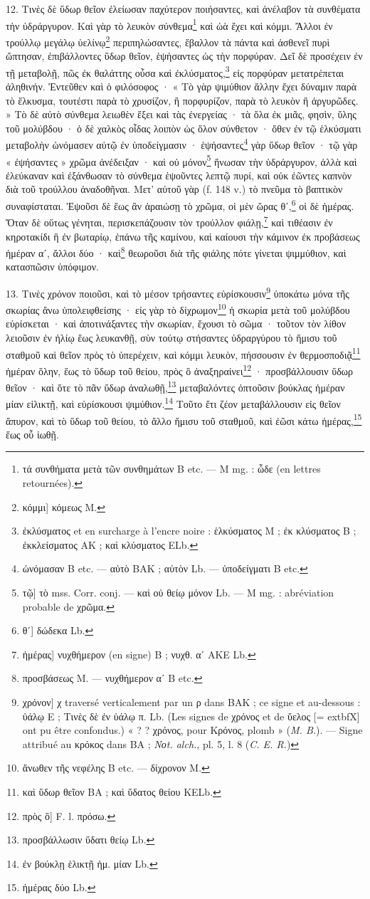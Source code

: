 \documentclass[landscape, a4paper, 11pt, oneside, polutonikogreek, french]{article}
\begin{document}
12. Τινὲς δὲ ὕδωρ θεῖον ἐλείωσαν παχύτερον ποιήσαντες, καὶ ἀνέλαβον τὰ συνθέματα τὴν ὑδράργυρον. Καὶ γὰρ τὸ λευκὸν σύνθεμα\footnote{τά συνθήματα μετὰ τῶν συνθημάτων B etc. --- M mg. : ὧδε (en lettres retournées).} καὶ ὠὰ ἔχει καὶ κόμμι. Ἄλλοι ἐν τρούλλῳ μεγάλῳ ὑελίνῳ\footnote{κόμμι] κόμεως M.} περιπηλώσαντες, ἔβαλλον τὰ πάντα καὶ ἀσθενεῖ πυρὶ ὤπτησαν, ἐπιβάλλοντες ὕδωρ θεῖον, ἑψήσαντες ὡς τὴν πορφύραν. Δεῖ δὲ προσέχειν ἐν τῇ μεταβολῇ, πῶς ἐκ θαλάττης οὖσα καὶ ἐκλύσματος,\footnote{ἐκλύσματος et en surcharge à l'encre noire : ἑλκύσματος M ; ἐκ κλύσματος B ; ἐκκλείσματος AK ; καὶ κλύσματος ELb.} εἰς πορφύραν μετατρέπεται ἀληθινήν. Ἐντεῦθεν καὶ ὁ φιλόσοφος · « Τὸ γὰρ ψιμύθιον ἄλλην ἔχει δύναμιν παρὰ τὸ ἕλκυσμα, τουτέστι παρὰ τὸ χρυσίζον, ἢ πορφυρίζον, παρὰ τὸ λευκὸν ἢ ἀργυρῶδες. » Τὸ δὲ αὐτὸ σύνθεμα λειωθὲν ἕξει καὶ τὰς ἐνεργείας · τὰ ὅλα ἐκ μιᾶς, φησὶν, ὕλης τοῦ μολύβδου · ὁ δὲ χαλκὸς οἶδας λοιπὸν ὡς ὅλον σύνθετον · ὅθεν ἐν τῷ ἑλκύσματι μεταβολὴν ὠνόμασεν αὐτῷ ἐν ὑποδείγμασιν · ἑψήσαντες\footnote{ὠνόμασαν B etc. --- αὐτὸ BAK ; αὐτὸν Lb. --- ὑποδείγματι B etc.} γὰρ ὕδωρ θεῖον · τῷ γὰρ « ἐψήσαντες » χρῶμα ἀνέδειξαν · καὶ οὐ μόνον\footnote{τῷ] τὸ mss. Corr. conj. --- καὶ οὐ θείῳ μόνον Lb. --- M mg. : abréviation probable de χρῶμα.} ἥνωσαν τὴν ὑδράργυρον, ἀλλὰ καὶ ἐλεύκαναν καὶ ἐξάνθωσαν τὸ σύνθεμα ἑψοῦντες λεπτῷ πυρί, καὶ οὐκ ἐῶντες καπνὸν διὰ τοῦ τρούλλου ἀναδοθῆναι. Μετ' αὐτοῦ γὰρ (f. 148 v.) τὸ πνεῦμα τὸ βαπτικὸν συναφίσταται. Ἑψοῦσι δὲ ἕως ἂν ἀραιώσῃ τὸ χρῶμα, οἱ μὲν ὥρας θʹ,\footnote{θʹ] δώδεκα Lb.} οἱ δὲ ἡμέρας. Ὅταν δὲ οὕτως γένηται, περισκεπάζουσιν τὸν τρούλλον φιάλῃ,\footnote{ἡμέρας] νυχθήμερον (en signe) B ; νυχθ. αʹ AKE Lb.} καὶ τιθέασιν ἐν κηροτακίδι ἢ ἐν βωταρίῳ, ἐπάνω τῆς καμίνου, καὶ καίουσι τὴν κάμινον ἐκ προβάσεως ἡμέραν αʹ, ἄλλοι δύο · καὶ\footnote{προσβάσεως M. --- νυχθήμερον αʹ B etc.} θεωροῦσι διὰ τῆς φιάλης πότε γίνεται ψιμμύθιον, καὶ κατασπῶσιν ὑπόφιμον.

13. Τινὲς χρόνον ποιοῦσι, καὶ τὸ μέσον τρήσαντες εὑρίσκουσιν\footnote{χρόνον] χ traversé verticalement par un ρ dans BAK ; ce signe et au-dessous : ὑάλῳ E ; Τινὲς δὲ ἐν ὑάλῳ π. Lb. (Les signes de χρόνος et de ὕελος [= 	extbf{Χ}] ont pu être confondus.) « ? ? χρόνος, pour Κρόνος, plomb » (\emph{M. B.}). --- Signe attribué au κρόκος dans BA ; \emph{Nοt. alch.}, pl. 5, l. 8 (\emph{C. E. R.})} ὑποκάτω μόνα τῆς σκωρίας ἄνω ὑπολειφθείσης · εἰς γὰρ τὸ δίχρωμον\footnote{ἄνωθεν τῆς νεφέλης B etc. --- δίχρονον M.} ἡ σκωρία μετὰ τοῦ μολύβδου εὑρίσκεται · καὶ ἀποτινάξαντες τὴν σκωρίαν, ἔχουσι τὸ σῶμα · τοῦτον τὸν λίθον λειοῦσιν ἐν ἡλίῳ ἕως λευκανθῇ, σὺν τούτῳ στήσαντες ὑδραργύρου τὸ ἥμισυ τοῦ σταθμοῦ καὶ θεῖον πρὸς τὸ ὑπερέχειν, καὶ κόμμι λευκὸν, πήσσουσιν ἐν θερμοσποδιᾷ\footnote{καὶ ὕδωρ θεῖον BA ; καὶ ὕδατος θείου KELb.} ἡμέραν ὅλην, ἕως τὸ ὕδωρ τοῦ θείου, πρὸς ὃ ἀναξηραίνει\footnote{πρὸς ὃ] F. l. πρόσω.} · προσβάλλουσιν ὕδωρ θεῖον · καὶ ὅτε τὸ πᾶν ὕδωρ ἀναλωθῇ,\footnote{προσβάλλωσιν ὕδατι θείῳ Lb.} μεταβαλόντες ὀπτοῦσιν βούκλας ἡμέραν μίαν εἱλικτῇ, καὶ εὑρίσκουσι ψιμύθιον.\footnote{ἐν βούκλῃ ἑλικτῇ ἡμ. μίαν Lb.} Τοῦτο ἔτι ζέον μεταβάλλουσιν εἰς θεῖον ἄπυρον, καὶ τὸ ὕδωρ τοῦ θείου, τὸ ἄλλο ἥμισυ τοῦ σταθμοῦ, καὶ ἐῶσι κάτω ἡμέρας,\footnote{ἡμέρας δύο Lb.} ἕως οὗ ἰωθῇ.
\end{document}
